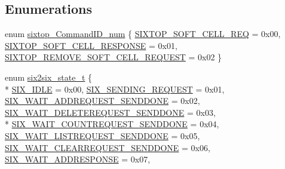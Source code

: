 \subsection*{Enumerations}
\begin{DoxyCompactItemize}
\item 
enum \hyperlink{group__sixtop_ga8161d14ed7c0b1839e3feb69349e8eb4}{sixtop\+\_\+\+Command\+I\+D\+\_\+num} \{ \hyperlink{group__sixtop_gga8161d14ed7c0b1839e3feb69349e8eb4a0ad40c703c2a81b01e3f1be8bea20ad5}{S\+I\+X\+T\+O\+P\+\_\+\+S\+O\+F\+T\+\_\+\+C\+E\+L\+L\+\_\+\+R\+EQ} = 0x00, 
\hyperlink{group__sixtop_gga8161d14ed7c0b1839e3feb69349e8eb4a5da1b52bd5a45f8e74177273bc68713c}{S\+I\+X\+T\+O\+P\+\_\+\+S\+O\+F\+T\+\_\+\+C\+E\+L\+L\+\_\+\+R\+E\+S\+P\+O\+N\+SE} = 0x01, 
\hyperlink{group__sixtop_gga8161d14ed7c0b1839e3feb69349e8eb4a85a4d9f653487b2e5c0d61d4f99ccdd1}{S\+I\+X\+T\+O\+P\+\_\+\+R\+E\+M\+O\+V\+E\+\_\+\+S\+O\+F\+T\+\_\+\+C\+E\+L\+L\+\_\+\+R\+E\+Q\+U\+E\+ST} = 0x02
 \}
\item 
enum \hyperlink{group__sixtop_ga0d114e8a582180b48d3b337cff5f90e0}{six2six\+\_\+state\+\_\+t} \{ \\*
\hyperlink{group__sixtop_gga0d114e8a582180b48d3b337cff5f90e0a8eff737a4dc265fd457301a51c030c66}{S\+I\+X\+\_\+\+I\+D\+LE} = 0x00, 
\hyperlink{group__sixtop_gga0d114e8a582180b48d3b337cff5f90e0abf12add745e22b60800ce2c6a62e1373}{S\+I\+X\+\_\+\+S\+E\+N\+D\+I\+N\+G\+\_\+\+R\+E\+Q\+U\+E\+ST} = 0x01, 
\hyperlink{group__sixtop_gga0d114e8a582180b48d3b337cff5f90e0a3417040b0066dfd51588b0f71ae91f70}{S\+I\+X\+\_\+\+W\+A\+I\+T\+\_\+\+A\+D\+D\+R\+E\+Q\+U\+E\+S\+T\+\_\+\+S\+E\+N\+D\+D\+O\+NE} = 0x02, 
\hyperlink{group__sixtop_gga0d114e8a582180b48d3b337cff5f90e0afd12611bd6c8a701284eaa711428b7a0}{S\+I\+X\+\_\+\+W\+A\+I\+T\+\_\+\+D\+E\+L\+E\+T\+E\+R\+E\+Q\+U\+E\+S\+T\+\_\+\+S\+E\+N\+D\+D\+O\+NE} = 0x03, 
\\*
\hyperlink{group__sixtop_gga0d114e8a582180b48d3b337cff5f90e0afdf425bb0501f7b98f621fcccb08d7d0}{S\+I\+X\+\_\+\+W\+A\+I\+T\+\_\+\+C\+O\+U\+N\+T\+R\+E\+Q\+U\+E\+S\+T\+\_\+\+S\+E\+N\+D\+D\+O\+NE} = 0x04, 
\hyperlink{group__sixtop_gga0d114e8a582180b48d3b337cff5f90e0a9bb0c7efbad25eb05f4a86f7b56510c1}{S\+I\+X\+\_\+\+W\+A\+I\+T\+\_\+\+L\+I\+S\+T\+R\+E\+Q\+U\+E\+S\+T\+\_\+\+S\+E\+N\+D\+D\+O\+NE} = 0x05, 
\hyperlink{group__sixtop_gga0d114e8a582180b48d3b337cff5f90e0a6aa2fe817064a0a167aa62ce15f5367b}{S\+I\+X\+\_\+\+W\+A\+I\+T\+\_\+\+C\+L\+E\+A\+R\+R\+E\+Q\+U\+E\+S\+T\+\_\+\+S\+E\+N\+D\+D\+O\+NE} = 0x06, 
\hyperlink{group__sixtop_gga0d114e8a582180b48d3b337cff5f90e0a2da41dc5ffe3a2da3b0466ea3e57491e}{S\+I\+X\+\_\+\+W\+A\+I\+T\+\_\+\+A\+D\+D\+R\+E\+S\+P\+O\+N\+SE} = 0x07, 

\end{DoxyCompactItemize}
